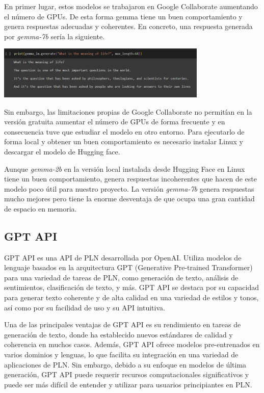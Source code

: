 En primer lugar, estos modelos se trabajaron en Google Collaborate aumentando el número de GPUs. De esta forma gemma tiene un buen comportamiento y genera respuestas adecuadas y coherentes. En concreto, una respuesta generada por \textit{gemma-7b} sería la siguiente.
\begin{center}
	\includegraphics[width=0.75\textwidth]{Imagenes/gemma (1)}
\end{center}
Sin embargo, las limitaciones propias de Google Collaborate no permitían en la versión gratuita aumentar el número de GPUs de forma frecuente y en consecuencia tuve que estudiar el modelo en otro entorno. Para ejecutarlo de forma local y obtener un buen comportamiento es necesario instalar Linux y descargar el modelo de Hugging face. 

Aunque \textit{gemma-2b} en la versión local instalada desde Hugging Face en Linux tiene un buen comportamiento, genera respuestas incoherentes que hacen de este modelo poco útil para nuestro proyecto. La versión \textit{gemma-7b} genera respuestas mucho mejores pero tiene la enorme desventaja de que ocupa una gran cantidad de espacio en memoria.

\subsection{GPT API}

GPT API es una API de PLN desarrollada por OpenAI. Utiliza modelos de lenguaje basados en la arquitectura GPT (Generative Pre-trained Transformer) para una variedad de tareas de PLN, como generación de texto, análisis de sentimientos, clasificación de texto, y más. GPT API se destaca por su capacidad para generar texto coherente y de alta calidad en una variedad de estilos y tonos, así como por su facilidad de uso y su API intuitiva.

Una de las principales ventajas de GPT API es su rendimiento en tareas de generación de texto, donde ha establecido nuevos estándares de calidad y coherencia en muchos casos. Además, GPT API ofrece modelos pre-entrenados en varios dominios y lenguas, lo que facilita su integración en una variedad de aplicaciones de PLN. Sin embargo, debido a su enfoque en modelos de última generación, GPT API puede requerir recursos computacionales significativos y puede ser más difícil de entender y utilizar para usuarios principiantes en PLN.

